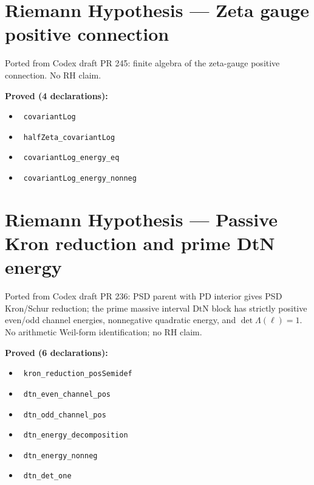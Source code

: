 \documentclass{report}
\theoremstyle{definition}
\begin{document}
\section{Riemann Hypothesis --- Zeta gauge positive connection}
Ported from Codex draft PR 245: finite algebra of the zeta-gauge positive connection. No RH claim.

\noindent\textbf{Proved (4 declarations):}
\begin{itemize}
  \item {}\leanok\ \texttt{covariantLog}
  \item {}\leanok\ \texttt{halfZeta\_covariantLog}
  \item {}\leanok\ \texttt{covariantLog\_energy\_eq}
  \item {}\leanok\ \texttt{covariantLog\_energy\_nonneg}
\end{itemize}

\section{Riemann Hypothesis --- Passive Kron reduction and prime DtN energy}
Ported from Codex draft PR 236: PSD parent with PD interior gives PSD Kron/Schur reduction; the prime massive interval DtN block has strictly positive even/odd channel energies, nonnegative quadratic energy, and $\det\Lambda(\ell)=1$. No arithmetic Weil-form identification; no RH claim.

\noindent\textbf{Proved (6 declarations):}
\begin{itemize}
  \item {}\leanok\ \texttt{kron\_reduction\_posSemidef}
  \item {}\leanok\ \texttt{dtn\_even\_channel\_pos}
  \item {}\leanok\ \texttt{dtn\_odd\_channel\_pos}
  \item {}\leanok\ \texttt{dtn\_energy\_decomposition}
  \item {}\leanok\ \texttt{dtn\_energy\_nonneg}
  \item {}\leanok\ \texttt{dtn\_det\_one}
\end{itemize}
\end{document}
